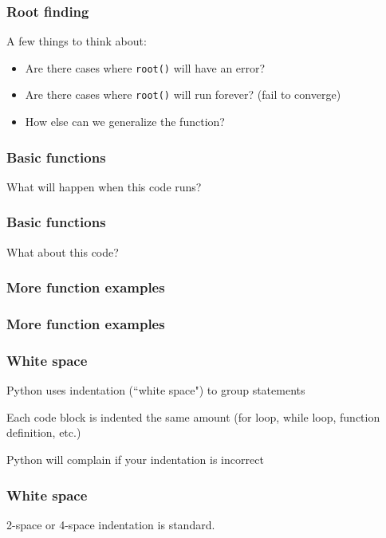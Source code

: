 \documentclass{beamer}
\begin{document}
\begin{frame}
\frametitle{Root finding}
A few things to think about:
\vspace{0.1in}
\begin{itemize}
\setlength{\itemsep}{0.1in}
\item{Are there cases where \texttt{root()} will have an error?}
\item{Are there cases where \texttt{root()} will run forever? (fail to converge)}
\item{How else can we generalize the function?}
\end{itemize}
\end{frame}


\begin{frame}
\frametitle{Basic functions}

What will happen when this code runs?



\end{frame}

\begin{frame}
\frametitle{Basic functions}

What about this code?

\end{frame}


\begin{frame}
\frametitle{More function examples}

\end{frame}

\begin{frame}
\frametitle{More function examples}

\end{frame}


\begin{frame}
\frametitle{White space}

Python uses indentation (``white space") to group statements

\vspace{0.15in}

Each code block is indented the same amount (for loop, while loop, function definition, etc.)

\vspace{0.15in}

Python will complain if your indentation is incorrect
\end{frame}

\begin{frame}
\frametitle{White space}


2-space or 4-space indentation is standard.

\end{frame}
\end{document}
